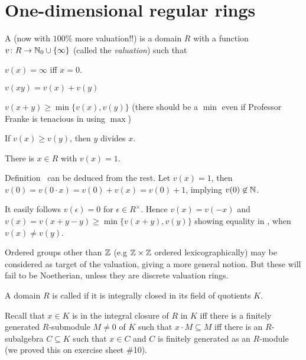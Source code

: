\documentclass[a4paper,parskip=half,numbers=enddot, DIV=12, headheight=30pt]{scrreprt}
\begin{document}
\section{One-dimensional regular rings}

\begin{defi}
    A  (now with $100\%$ more valuation!!) is a domain $R$ with a function $v\colon R\morphism \IN_0\cup\{\infty\}$ (called the \emph{valuation}) such that
    \begin{alphanumerate}
    \item 
        $v(x)=\infty$ iff $x = 0$.
    \item 
        $v(xy) = v(x) + v(y)$
    \item 
        $v(x+y) \geq \min\{v(x), v(y)\}$ (there should be a $\min$ even if Professor Franke is tenacious in using $\max$)
    \item 
        If $v(x)\geq v(y)$, then $y$ divides $x$. 
    \item 
        There is $x\in R$ with $v(x) = 1$.
    \end{alphanumerate}
\end{defi}
\begin{rem}
    \begin{alphanumerate}
    \item 
        Definition~ can be deduced from the rest. Let $v(x) = 1$, then $v(0) = v(0\cdot x) = v(0) + v(x) = v(0) +1$, implying $v(0)\not \in \mathbb{N}$. 
    \item 
        It easily follows $v(\epsilon) = 0$ for $\epsilon \in R^\times$. Hence $v(x) = v(-x)$ and $v(x) = v(x+y-y) \geq \min\{v(x+y), v(y)\}$ showing equality in , when $v(x) \neq v(y)$.
    \item 
        Ordered groups other than $\mathbb{Z}$ (e.g $\mathbb{Z}\times \mathbb{Z}$ ordered lexicographically) may be considered as target of the valuation, giving a more general notion. But these will fail to be Noetherian, unless they are discrete valuation rings.
    \end{alphanumerate}
\end{rem}
\begin{defi}
    A domain $R$ is called  if it is integrally closed in its field of quotients $K$. 
\end{defi}
Recall that $x\in K$ is in the integral closure of $R$ in $K$ iff there is a finitely generated $R$-submodule $M\neq 0$ of $K$ such that $x\cdot M\subseteq M$  iff there is an $R$-subalgebra $C\subseteq K$ such that $x\in C$ and $C$ is finitely generated as an $R$-module (we proved this on exercise sheet \#10).
\end{document}
